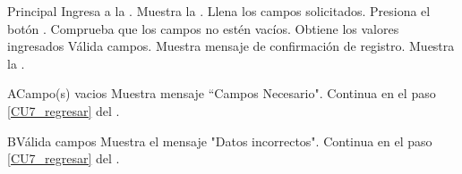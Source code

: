     \begin{UCtrayectoria}{Principal}
    \UCpaso[\UCactor] Ingresa a la .
    \UCpaso Muestra la .
    \UCpaso[\UCactor] Llena los campos solicitados. \label{CU7_regresar}
    \UCpaso[\UCactor] Presiona el botón .
    \UCpaso Comprueba que los campos no estén vacíos. 
    \UCpaso Obtiene los valores ingresados
    \UCpaso Válida campos. 
    \UCpaso Muestra mensaje de confirmación de registro.
    \UCpaso Muestra la .
    \end{UCtrayectoria}
    
    \begin{UCtrayectoriaA}{A}{Campo(s) vacios}
    	\UCpaso Muestra mensaje “Campos Necesario".
    	\UCpaso Continua en el paso \ref{CU7_regresar} del .
    \end{UCtrayectoriaA}

	\begin{UCtrayectoriaA}{B}{Válida campos}
		\UCpaso Muestra el mensaje "Datos incorrectos".
   		\UCpaso Continua en el paso \ref{CU7_regresar} del .
	\end{UCtrayectoriaA}

	


